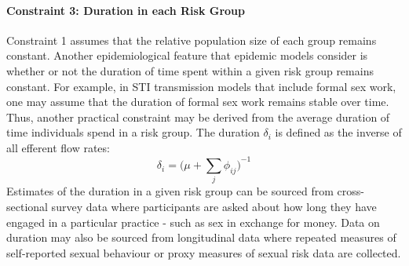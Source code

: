 \paragraph{Constraint 3: Duration in each Risk Group}						%
Constraint 1 assumes that the relative population size of each group remains constant.
Another epidemiological feature that epidemic models consider
is whether or not the duration of time spent within a given risk group remains constant. 
For example, in STI transmission models that include formal sex work, 
one may assume that the duration of formal sex work remains stable over time.  %
Thus, another practical constraint may be derived from
the average duration of time individuals spend in a risk group.
The duration $\delta_i$ is defined as the inverse of all efferent flow rates:		%
\begin{equation}\label{eq:duration-group}
\delta_i = {\bigg(\mu + \sum_{j}{\phi_{ij}}\bigg)}^{-1}
\end{equation}
Estimates of the duration in a given risk group can be 
sourced from cross-sectional survey data where participants are asked about 
how long they have engaged in a particular practice - such as sex in exchange for money. %
Data on duration may also be sourced from longitudinal data where repeated measures of self-reported sexual behaviour or 
proxy measures of sexual risk data are collected. %


